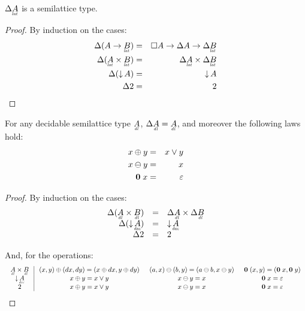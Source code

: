 \documentclass{article}
\begin{document}

\begin{lemma}
  $\GD \lat{A}$ is a semilattice type.

\end{lemma}
\begin{proof}
  By induction on the cases:
  \begin{eqnarray*}
    \GD(A \to \lat{B}) &=& \Disc{A} \to \GD A \to \GD \lat{B}\\
    \GD(\lat{A} \x \lat{B}) &=& \GD \lat{A} \x \GD \lat{B}\\
    \GD(\Down{A}) &=& \Down{A}\\
    \GD 2 &=& 2
  \end{eqnarray*}
\end{proof}

\begin{lemma}\label{lemma:dl-boring}
  For any decidable semilattice type $\eqlat{A}$, $\GD \eqlat{A} = \eqlat{A}$,
  and moreover the following laws hold:
  \begin{eqnarray*}
    x \oplus y &=& x \vee y\\
    x \ominus y &=& x\\
    \mathbf{0}\; x &=& \varepsilon
  \end{eqnarray*}
\end{lemma}
\begin{proof}
  By induction on the cases:
  \[\begin{array}{rcl}
    \GD(\eqlat{A} \x \eqlat{B}) &=& \GD \eqlat{A} \x \GD \eqlat{B}\\
    \GD(\Down{\eq{A}}) &=& \Down{\eq{A}}\\
    \GD \tbool &=& \tbool
  \end{array}\]

  And, for the operations:
  \[\arraycolsep=0.75em
  \begin{array}{c|ccc}
    \eqlat{A} \x \eqlat{B}
    & (x,y) \oplus (dx,dy) = (x \oplus dx, y \oplus dy)
    & (a,x) \ominus (b,y) = (a \ominus b, x \ominus y)
    & \mb{0}\; (x,y) = (\mb{0}\; x, \mb{0}\; y)\\
    \Down{\eq{A}}
    & x \oplus y = x \vee y
    & x \ominus y = x
    & \mb{0}\;x = \unit\\
    \tbool
    & x \oplus y = x \vee y
    & x \ominus y = x
    & \mb{0}\;x = \unit\\
  \end{array}
  \]
\end{proof}
\end{document}

